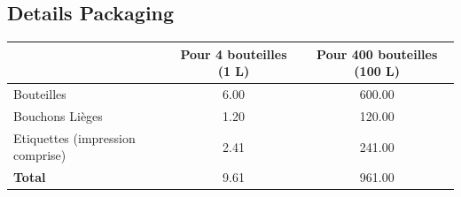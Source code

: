\documentclass[10pt,a4paper]{article}
\begin{document}
\subsection{Details Packaging}
\begin{tabular}{|l|S[table-format=4.2]|S[table-format=4.2]|}
\hline
& \textbf{Pour 4 bouteilles (1 L)} & \textbf{Pour 400 bouteilles (100 L)} \\\hline
Bouteilles & 6.00 & 600.00 \\
Bouchons Lièges & 1.20 & 120.00 \\
Etiquettes (impression comprise)& 2.41& 241.00 \\\hline
\textbf{Total} & 9.61 & 961.00\\\hline
\end{tabular}
\end{document}
